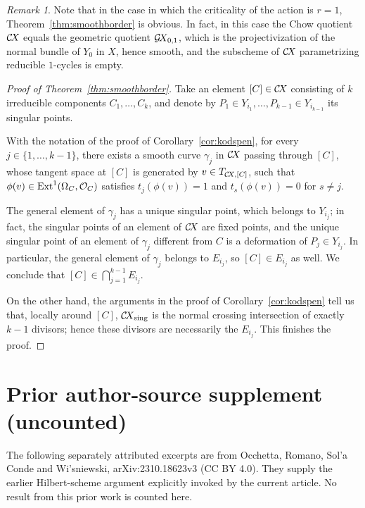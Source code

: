 \documentclass[10pt,a4paper]{article}
\numberwithin{equation}{section}
\theoremstyle{definition}
\theoremstyle{remark}
\newtheorem{remark}[theorem]{Remark}
\def\sing{\operatorname{sing}}
\def\cO{{\mathcal{O}}}
\def\operatorname#1{\mathop{\rm #1}\nolimits}
\def\Ext{\operatorname{Ext}}
\def\GX{\mathcal{G}\!X\hspace{-0.5pt}}
\def\CX{\mathcal{C}\!X\hspace{-0.5pt}}
\begin{document}
\begin{remark}\label{rem:main1}
Note that in the case in which the criticality of the action is $r=1$, Theorem~\ref{thm:smoothborder} is obvious. In fact, in this case the Chow quotient $\CX$ equals the geometric quotient $\GX_{0,1}$, which is the projectivization of the normal bundle of $Y_0$ in $X$, hence smooth, and the subscheme of $\CX$ parametrizing reducible $1$-cycles is empty.
\end{remark}

\begin{proof}[Proof of Theorem~\ref{thm:smoothborder}]
Take an element $[C]\in \CX$ consisting of $k$ irreducible components $C_1,\dots,C_k$, and denote by $P_1\in Y_{i_1},\dots, P_{k-1}\in Y_{i_{k-1}}$ its singular points. 

With the notation of the proof of Corollary~\ref{cor:kodspen}, for every $j\in\{1,\dots,k-1\}$, there exists a smooth  curve $\gamma_j$ in $\CX$ passing through
 $[C]$, whose tangent space at $[C]$ is generated by $v\in T_{\CX,[C]}$, such that $\phi(v)\in \Ext^1(\Omega_C,\cO_C)$ satisfies $t_j(\phi(v))=1$ and $t_s(\phi(v))=0$ for $s\neq j$. 

The general element of $\gamma_j$ has a unique singular point, which belongs to $Y_{i_j}$; in fact, the singular points of an element of $\CX$ are fixed points, and the unique singular point of an element of $\gamma_j$ different from $C$ is a deformation of $P_j\in Y_{i_j}$. In particular, the general element of $\gamma_j$ belongs to  $E_{i_j}$, so $[C]\in E_{i_j}$ as well. We conclude that $[C]\in \bigcap_{j=1}^{k-1}E_{i_j}$.


On the other hand, the arguments in the proof of Corollary~\ref{cor:kodspen} tell us that, locally around $[C]$, $\CX_{\sing}$ is the normal crossing intersection of exactly $k-1$ divisors; hence these divisors are necessarily the $E_{i_j}$.  This finishes the proof.
\end{proof}

\clearpage
\section*{Prior author-source supplement (uncounted)}
The following separately attributed excerpts are from Occhetta, Romano, Sol'a Conde and Wi'sniewski, arXiv:2310.18623v3 (CC BY 4.0). They supply the earlier Hilbert-scheme argument explicitly invoked by the current article. No result from this prior work is counted here.
\renewcommand{\theHsection}{wors6.\arabic{section}}
\renewcommand{\theHtheorem}{wors6.\arabic{section}.\arabic{theorem}}
\renewcommand{\theHequation}{wors6.\arabic{section}.\arabic{equation}}\renewcommand{\theequation}{\arabic{equation}}
\setcounter{section}{1}\setcounter{theorem}{0}\setcounter{equation}{1}
\begingroup\small
\end{document}
